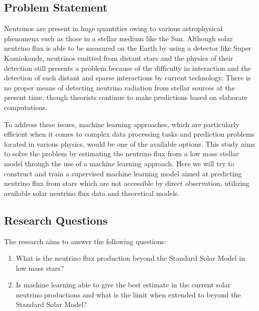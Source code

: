\subsection{Problem Statement}
Neutrinos are present in huge quantities owing to various astrophysical phenomena such as those in a stellar medium like the Sun. Although solar neutrino flux is able to be measured on the Earth by using a detector like Super Kamiokande, neutrinos emitted from distant stars and the physics of their detection still presents a problem because of the difficulty in interaction and the detection of such distant and sparse interactions by current technology. There is no proper means of detecting neutrino radiation from stellar sources at the present time, though theorists continue to make predictions based on elaborate computations.
 
To address these issues, machine learning approaches, which are particularly efficient when it comes to complex data processing tasks and prediction problems located in various physics, would be one of the available options. This study aims to solve the problem by estimating the neutrino flux from a low mass stellar model through the use of a machine learning approach. Here we will try to construct and train a supervised machine learning model aimed at predicting neutrino flux from stars which are not accessible by direct observation, utilizing available solar neutrino flux data and theoretical models.


\subsection{Research Questions}

The research aims to answer the following questions:
\begin{enumerate}
	\item What is the neutrino flux production beyond the Standard Solar Model in low mass stars?
	\item Is machine learning able to give the best estimate in the current solar neutrino productions and what is the limit when extended to beyond the Standard Solar Model? 
	
\end{enumerate}
